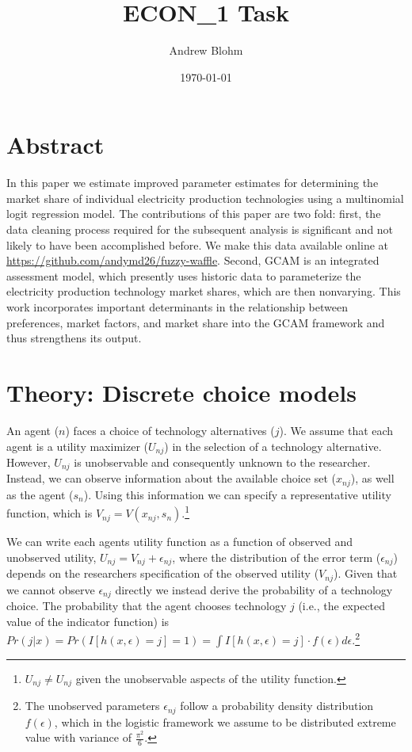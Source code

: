 \documentclass[10pt]{amsart}
\title{ECON\_1 Task}
\author{Andrew Blohm}
\date{\today}
\begin{document}
\maketitle

\section{Abstract}
In this paper we estimate improved parameter estimates for determining the market share of individual electricity production technologies using a multinomial logit regression model. 
The contributions of this paper are two fold: first, the data cleaning process required for the subsequent analysis is significant and not likely to have been accomplished before.
We make this data available online at \url{https://github.com/andymd26/fuzzy-waffle}. 
Second, GCAM is an integrated assessment model, which presently uses historic data to parameterize the electricity production technology market shares, which are then nonvarying. 
This work incorporates important determinants in the relationship between preferences, market factors, and market share into the GCAM framework and thus strengthens its output.  

\section{Theory: Discrete choice models}
An agent ($n$) faces a choice of technology alternatives ($j$).  
We assume that each agent is a utility maximizer ($U_{nj}$) in the selection of a technology alternative.
However, $U_{nj}$ is unobservable and consequently unknown to the researcher.
Instead, we can observe information about the available choice set ($x_{nj}$), as well as the agent ($s_{n}$).
Using this information we can specify a representative utility function, which is $V_{nj} = V(x_{nj}, s_{n})$.\footnote{$U_{nj} \neq U_{nj}$ given the unobservable aspects of the utility function.} 

We can write each agents utility function as a function of observed and unobserved utility, $U_{nj} = V_{nj} + \epsilon_{nj}$, where the distribution of the error term ($\epsilon_{nj}$) depends on the researchers specification of the observed utility ($V_{nj}$). 
Given that we cannot observe $\epsilon_{nj}$ directly we instead derive the probability of a technology choice. 
The probability that the agent chooses technology $j$ (i.e., the expected value of the indicator function) is $Pr(j \vert x) = Pr(I[h(x, \epsilon) = j] = 1) = \int I[h(x, \epsilon) = j]\cdot f(\epsilon) d\epsilon$.\footnote{The unobserved parameters $\epsilon_{nj}$ follow a probability density distribution $f(\epsilon)$, which in the logistic framework we assume to be distributed extreme value with variance of $\frac{\pi^2}{6}$.}
\end{document}
